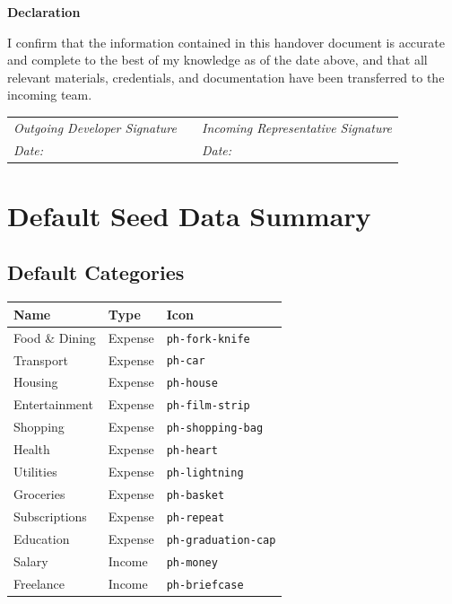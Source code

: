 \documentclass[12pt, a4paper]{article}
\begin{document}
\vspace{1.5cm}

\noindent\textbf{Declaration}

\vspace{0.3cm}

\noindent I confirm that the information contained in this handover document is accurate and complete to the best of my knowledge as of the date above, and that all relevant materials, credentials, and documentation have been transferred to the incoming team.

\vspace{2cm}

\noindent\begin{tabular}{@{}p{6cm} p{2cm} p{6cm}}
  \cline{1-1}\cline{3-3}\\[-8pt]
  \textit{Outgoing Developer Signature} & & \textit{Incoming Representative Signature}\\[6pt]
  \textit{Date:} \underline{\hspace{3cm}} & & \textit{Date:} \underline{\hspace{3cm}}
\end{tabular}

\appendix
\section{Default Seed Data Summary}

\subsection{Default Categories}

\begin{longtable}{L{3.5cm} C{2.5cm} L{7.5cm}}
  \toprule
  \textbf{Name} & \textbf{Type} & \textbf{Icon} \\
  \midrule
  \endhead
  Food \& Dining      & Expense & \texttt{ph-fork-knife} \\
  Transport           & Expense & \texttt{ph-car} \\
  Housing             & Expense & \texttt{ph-house} \\
  Entertainment       & Expense & \texttt{ph-film-strip} \\
  Shopping            & Expense & \texttt{ph-shopping-bag} \\
  Health              & Expense & \texttt{ph-heart} \\
  Utilities           & Expense & \texttt{ph-lightning} \\
  Groceries           & Expense & \texttt{ph-basket} \\
  Subscriptions       & Expense & \texttt{ph-repeat} \\
  Education           & Expense & \texttt{ph-graduation-cap} \\
  Salary              & Income  & \texttt{ph-money} \\
  Freelance           & Income  & \texttt{ph-briefcase} \\
  \bottomrule
\end{longtable}
\end{document}
